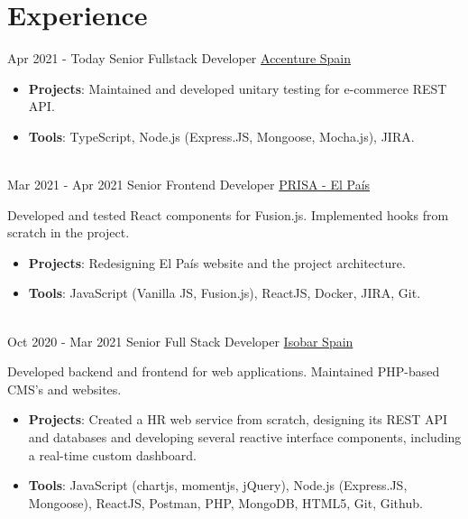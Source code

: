 \documentclass[letterpaper]{twentysecondcv} %
\begin{document}
\makeprofile %
 

\section{Experience}
\begin{twenty} %
    \twentyitem
    	{Apr 2021 -}
		{Today}
        {Senior Fullstack Developer}
        {\href{https://www.accenture.com/es-es}{Accenture Spain}}
        {}
        {\begin{itemize}
        \item \textbf{Projects}: Maintained and developed unitary testing for e-commerce REST API.
        \item \textbf{Tools}: TypeScript, Node.js (Express.JS, Mongoose, Mocha.js), JIRA.
        \end{itemize}}
        \\
    \twentyitem
    	{Mar 2021 -}
		{Apr 2021}
        {Senior Frontend Developer}
        {\href{https://www.prisa.com/}{PRISA - El Pa\'is}}
        {}
        {Developed and tested React components for Fusion.js. Implemented hooks from scratch in the project.
        \begin{itemize}
        \item \textbf{Projects}: Redesigning El Pa\'is website and the project architecture.
        \item \textbf{Tools}: JavaScript (Vanilla JS, Fusion.js), ReactJS, Docker, JIRA, Git.
        \end{itemize}}
        \\
    \twentyitem
    	{Oct 2020 -}
		{Mar 2021}
        {Senior Full Stack Developer}
        {\href{https://www.isobar.com/es-es}{Isobar Spain}}
        {}
        {
        Developed backend and frontend for web applications. Maintained PHP-based CMS's and websites.
        \begin{itemize}
            \item \textbf{Projects}: Created a HR web service from scratch, designing its REST API and databases and developing several reactive interface components, including a real-time custom dashboard.
            \item \textbf{Tools}: JavaScript (chartjs, momentjs, jQuery), Node.js (Express.JS, Mongoose), ReactJS, Postman, PHP, MongoDB, HTML5, Git, Github.

\end{itemize}}
\end{twenty}
\end{document}
